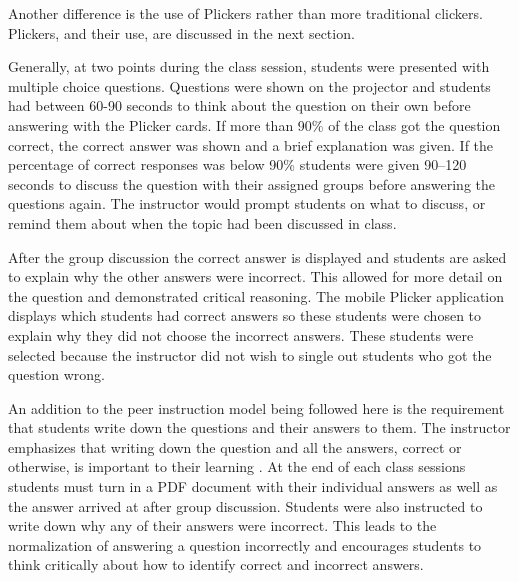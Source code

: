 \documentclass[12pt]{article}
\begin{document}
Another difference is the use of Plickers rather than more traditional clickers. Plickers, and their use, are discussed in the next section.

Generally, at two points during the class session, students were presented with multiple choice questions. Questions were shown on the projector and students had between 60-90 seconds to think about the question on their own before answering with the Plicker cards. If more than 90\% of the class got the question correct, the correct answer was shown and a brief explanation was given. If the percentage of correct responses was below 90\% students were given 90–120 seconds to discuss the question with their assigned groups before answering the questions again. The instructor would prompt students on what to discuss, or remind them about when the topic had been discussed in class. 

After the group discussion the correct answer is displayed and students are asked to explain why the other answers were incorrect. This allowed for more detail on the question and demonstrated critical reasoning. The mobile Plicker application displays which students had correct answers so these students were chosen to explain why they did not choose the incorrect answers. These students were selected because the instructor did not wish to single out students who got the question wrong.

An addition to the peer instruction model being followed here is the requirement that students write down the questions and their answers to them. The instructor emphasizes that writing down the question and all the answers, correct or otherwise, is important to their learning \cite{metcalfeMemoryTruthCorrecting2019}. At the end of each class sessions students must turn in a PDF document with their individual answers as well as the answer arrived at after group discussion. Students were also instructed to write down why any of their answers were incorrect. This leads to the normalization of answering a question incorrectly and encourages students to think critically about how to identify correct and incorrect answers.
\end{document}
